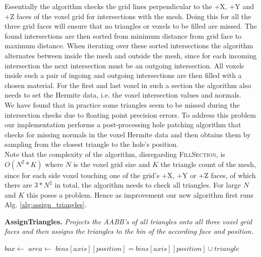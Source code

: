 Essentially the algorithm checks the grid lines perpendicular to the +X, +Y and +Z faces of the voxel grid for intersections
with the mesh. Doing this for all the three grid faces will ensure that no triangles or voxels to be filled are missed.
The found intersections are then sorted from minimum distance from grid face to maximum distance. When iterating over these
sorted intersections the algorithm alternates between inside the mesh and outside the mesh, since for each incoming intersection
the next intersection must be an outgoing intersection. All voxels inside such a pair of ingoing and outgoing intersections are
then filled with a chosen material. For the first and last voxel in such a section the algorithm also needs to set the Hermite data, i.e. the voxel intersection values and normals.\\
We have found that in practice some triangles seem to be missed during the intersection checks due to floating point precision errors. To address this problem our implementation performs a post-processing
hole patching algorithm that checks for missing normals in the voxel Hermite data and then obtains them by sampling from the closest
triangle to the hole's position.\\
Note that the complexity of the algorithm, disregarding \textsc{FillSection}, is $O(N^2 * K)$ where $N$ is the voxel grid
size and $K$ the triangle count of the mesh, since for each side voxel touching one of the grid's +X, +Y or +Z faces, of which there are $3*N^2$ in total, the algorithm needs to check all triangles. For large $N$ and $K$ this poses a problem. Hence as improvement our new
algorithm first runs Alg. \ref{alg:assign_triangles}.

\begin{algorithm}[H]
\caption{\textbf{AssignTriangles.} \textit{Projects the AABB's of all triangles onto all three voxel grid faces and then
assigns the triangles to the bin of the according face and position.}}\label{alg:assign_triangles}
\begin{algorithmic}[1]
			\State $box \gets$ 
			\State $area \gets$ 
				\State $bins[axis][position] = bins[axis][position] \cup triangle$
			\EndFor
		\EndFor
	\EndFor
\EndProcedure
\end{algorithmic}
\end{algorithm}

